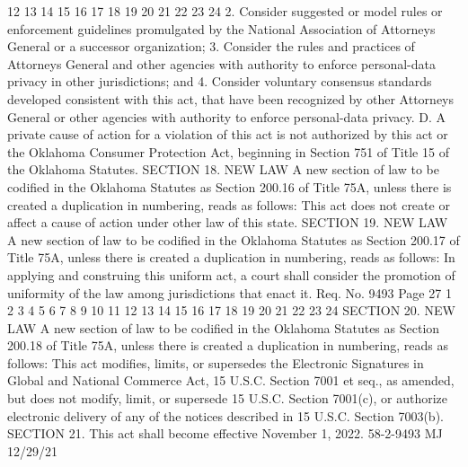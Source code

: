 12
13
14
15
16
17
18
19
20
21
22
23
24
2. Consider suggested or model rules or enforcement guidelines
promulgated by the National Association of Attorneys General or a
successor organization;
3. Consider the rules and practices of Attorneys General and
other agencies with authority to enforce personal-data privacy in
other jurisdictions; and
4. Consider voluntary consensus standards developed consistent
with this act, that have been recognized by other Attorneys General
or other agencies with authority to enforce personal-data privacy.
D. A private cause of action for a violation of this act is not
authorized by this act or the Oklahoma Consumer Protection Act,
beginning in Section 751 of Title 15 of the Oklahoma Statutes.
SECTION 18. NEW LAW A new section of law to be codified
in the Oklahoma Statutes as Section 200.16 of Title 75A, unless
there is created a duplication in numbering, reads as follows:
This act does not create or affect a cause of action under other
law of this state.
SECTION 19. NEW LAW A new section of law to be codified
in the Oklahoma Statutes as Section 200.17 of Title 75A, unless
there is created a duplication in numbering, reads as follows:
In applying and construing this uniform act, a court shall
consider the promotion of uniformity of the law among jurisdictions
that enact it.
Req. No. 9493 Page 27
1
2
3
4
5
6
7
8
9
10
11
12
13
14
15
16
17
18
19
20
21
22
23
24
SECTION 20. NEW LAW A new section of law to be codified
in the Oklahoma Statutes as Section 200.18 of Title 75A, unless
there is created a duplication in numbering, reads as follows:
This act modifies, limits, or supersedes the Electronic
Signatures in Global and National Commerce Act, 15 U.S.C. Section
7001 et seq., as amended, but does not modify, limit, or supersede
15 U.S.C. Section 7001(c), or authorize electronic delivery of any
of the notices described in 15 U.S.C. Section 7003(b).
SECTION 21. This act shall become effective November 1, 2022.
58-2-9493 MJ 12/29/21